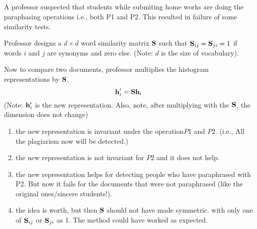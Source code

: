 \begin{frame}
\section{}
A professor suspected that students while submiting home works are doing the paraphasing operations i.e., both P1 and P2. This resulted in failure of  some similarity tests.

Professor designs a $d\times d$  word similarity matrix ${\bf S}$ such that ${\bf S}_{ij} = {\bf S}_{ji} = 1$ if words $i$ and $j$ are synonyms and zero else. (Note: $d$ is the size of vocabulary).

Now to compare two documents, professor multiplies the histogram representations by ${\bf S}$.
\[ {\bf h}_i^\prime = {\bf S}{\bf h}_i  \](Note: ${\bf h}_i^\prime$ is the new representation. Also, note, after multiplying with the ${\bf S}$, the dimension does not change)

\begin{enumerate}
\item the new representation is invariant under the operation$P1$ and  $P2$. (i.e.,  All the plagiarism now will be detected.)  %
\item the new representation is not invariant for $P2$ and it does not help.
\item the new representation helps for detecting people who have paraphrased with P2.  But now it
fails for the documents that were not paraphrased (like the original ones/sincere students!).
\item the idea is worth, but then ${\bf S}$ should not have made symmetric. with only one of ${\bf S}_{ij}$ or ${\bf S}_{ji}$ as 1. The method could have worked as expected.
\end{enumerate}
\end{frame}

